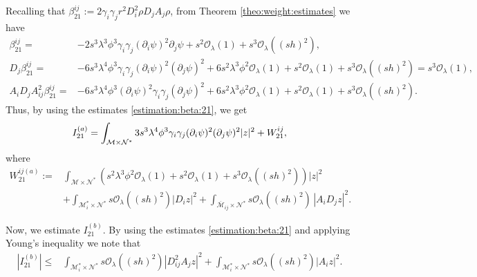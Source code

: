 \documentclass[11pt,oneside,leqno]{amsart}
\numberwithin{equation}{section}
\numberwithin{equation}{section}
\begin{document}
Recalling that $\beta_{21}^{ij}:=2\gamma_{i}\gamma_{j}r^{2}D_{i}^{2}\rho D_{j}A_{j}\rho$, from Theorem \ref{theo:weight:estimates} we have
\begin{equation}\label{estimation:beta:21}
    \begin{split}
    \beta_{21}^{ij}=&-2s^{3}\lambda^{3}\phi^{3}\gamma_{i}\gamma_{j}(\partial_{i}\psi)^{2}\partial_{j}\psi+s^{2}\mathcal{O}_{\lambda}(1)+s^{3}\mathcal{O}_{\lambda}((sh)^{2}),\\
        D_{j}\beta_{21}^{ij}=&-6s^{3}\lambda^{4}\phi^{3}\gamma_{i}\gamma_{j}(\partial_{i}\psi)^{2}(\partial_{j}\psi)^{2}+6s^{2}\lambda^{3}\phi^{2}\mathcal{O}_{\lambda}(1)+s^{2}\mathcal{O}_{\lambda}(1)+s^{3}\mathcal{O}_{\lambda}((sh)^{2})=s^{3}\mathcal{O}_{\lambda}(1),\\
        A_{i}D_{j}A_{ij}^{2}\beta_{21}^{ij}=&-6s^{3}\lambda^{4}\phi^{3}(\partial_{i}\psi)^{2}\gamma_{i}\gamma_{j}(\partial_{j}\psi)^{2}+6s^{2}\lambda^{3}\phi^{2}\mathcal{O}_{\lambda}(1)+s^{2}\mathcal{O}_{\lambda}(1)+s^{3}\mathcal{O}_{\lambda}((sh)^{2}).
    \end{split}
\end{equation}
Thus, by using the estimates \eqref{estimation:beta:21}, we get
\begin{equation}\label{eq:J_{21a}}
        I_{21}^{(a)}=\int_{\mathcal{M}\times\mathcal{N}^{\ast}}3s^{3}\lambda^{4}\phi^{3}\gamma_{i}\gamma_{j}(\partial_{i}\psi)^{2}(\partial_{j}\psi)^{2}|z|^{2}+W_{21}^{ij},
\end{equation}
where
\begin{equation}
    \begin{split}
        W_{21}^{ij(a)}:=&\int_{\mathcal{M}\times\mathcal{N}^{\ast}}\left( s^{2}\lambda^{3}\phi^{2}\mathcal{O}_{\lambda}(1)+s^{2}\mathcal{O}_{\lambda}(1)+s^{3}\mathcal{O}_{\lambda}((sh)^{2})\right)|z|^{2}\\
        &+\int_{\mathcal{M}_{i}^{\ast}\times\mathcal{N}^{\ast}}s\mathcal{O}_{\lambda}((sh)^{2})|D_{i}z|^{2}+\int_{\overline{\mathcal{M}}_{ij}\times\mathcal{N}^{\ast}}s\mathcal{O}_{\lambda}((sh)^{2})\,|A_{i}D_{j}z|^{2}.
        \end{split}
\end{equation}
\par Now, we estimate $I_{21}^{(b)}$. By using the estimates \eqref{estimation:beta:21} and applying  Young's inequality we note that
\begin{equation}
\begin{split}
    |I_{21}^{(b)}|\leq&\int_{\mathcal{M}_{i}^{\ast}\times\mathcal{N}^{\ast}}s\mathcal{O}_{\lambda}((sh)^{2})|D_{ij}^{2}A_{j}z|^{2}+\int_{\mathcal{M}_{i}^{\ast}\times\mathcal{N}^{\ast}}s\mathcal{O}_{\lambda}((sh)^{2})|A_{i}z|^{2}.
    \end{split}
\end{equation}
\end{document}
